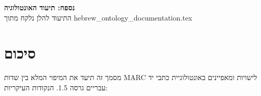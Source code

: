 \documentclass[12pt,a4paper]{article}
\begin{document}
\newpage
\begin{center}
\textbf{נספח: תיעוד האונטולוגיה}\\
התיעוד להלן נלקח מתוך \textenglish{hebrew\_ontology\_documentation.tex}
\end{center}



\newpage
\section*{סיכום}

מסמך זה תיעד את המיפוי המלא בין שדות MARC לישויות ומאפיינים באונטולוגיית כתבי יד עבריים גרסה 1.5. הנקודות העיקריות:
\end{document}
